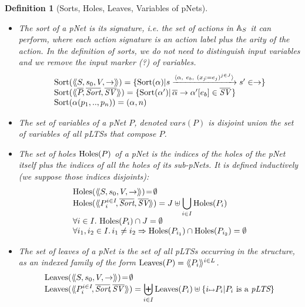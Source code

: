 \documentclass{lmcs}
\newtheorem{definition}{Definition}
\begin{document}
\begin{definition}[Sorts, Holes, Leaves, Variables of pNets]\label{def-sortholeleave}~~

  \begin{itemize}
  \item The sort of a pNet is its signature, i.e. the set of actions in $\mathbb{A}_S$ it can
perform, where each action signature is an action 
label plus the arity of the action. In the definition of sorts, we do not need to 
distinguish
input variables and we remove the
\emph{input marker} (?) of variables.
\[
\begin{array}{l}
\Sortop(\mylangle S,s_0,V, \to\myrangle) = \{\Sortop(\alpha)|s \xrightarrow{\langle \alpha,~e_b,~(x_j\!:= {e}_j)^{j\in
    J}\rangle} s'\in \to \} \\
\Sortop(\mylangle \set{\pNet}\!, %
\set{\Sort},
\set{\symb{SV}\,}\myrangle)
=\{\Sortop(\alpha') |\, \SV{\set{\alpha}}{\alpha'}{e_b}\in\set{\symb{SV}}\,\}\\
\Sortop(\alpha(p_1,..,p_n))=(\alpha,n)
\end{array}
\]

\item The set of variables of a pNet $P$, denoted $vars(P)$ is disjoint union the set of variables of  all pLTSs that compose $P$.

\item
The set of holes $\operatorname{Holes}(P)$ of a pNet is the indices of the holes of the pNet 
itself plus the indices of all the holes of its sub-pNets.
It is defined inductively (we suppose those indices 
disjoints):
  \[\begin{array}{l}
\Holes(\mylangle S,s_0,V, \to\myrangle) \!=\! \emptyset\\
\Holes(\mylangle \pNet_i^{i\in I}\!,\set{\Sort}, \set{\symb{SV}}\myrangle) 
=J\uplus{\displaystyle \bigcup_{i\in 
I}\Holes(\pNet_i)}\\
\forall i\in I.\, \Holes(\pNet_i)\cap J=\emptyset\\
\forall i_1,i_2\in I.\,i_1\neq i_2\Rightarrow  \Holes(\pNet_{i_1})\cap\Holes(\pNet_{i_2})=\emptyset
\end{array}\]

\item
The set of leaves of a pNet is the set of all pLTSs occurring in the structure, as an 
indexed family of the form $\operatorname{Leaves}(P)= \langle\hspace{-0.45ex}\langle P_i \rangle\hspace{-0.45ex}\rangle^{i \in L}$.
\[\begin{array}{l}
\Leaves(\mylangle S,s_0,V, \to\myrangle) \!=\!\emptyset\\%
\Leaves(\mylangle \pNet_i^{i\in I}\!,%
\set{\Sort}\!, \set{\symb{SV}\,}\myrangle) = {\displaystyle \biguplus_{i\in 
I}\Leaves(\pNet_i)\uplus\{i\mapsto \pNet_i|\pNet_i \text{ is a }\pLTS\}}
\end{array}\]
\end{itemize}


\end{definition}
\end{document}
